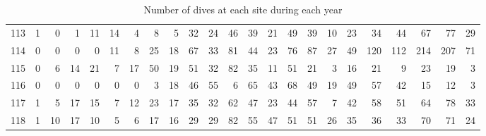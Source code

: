 \documentclass[a4paper]{article}
\begin{document}
\begin{sidewaystable}[h!]
\begin{tabular}{rrrrrrrrrrrrrrrrrrrrrrr}
  113 &   1 &   0 &   1 &  11 &  14 &   4 &   8 &   5 &  32 &  24 &  46 &  39 &  21 &  49 &  39 &  10 &  23 &  34 &  44 &  67 &  77 &  29 \\ 
  114 &   0 &   0 &   0 &   0 &  11 &   8 &  25 &  18 &  67 &  33 &  81 &  44 &  23 &  76 &  87 &  27 &  49 & 120 & 112 & 214 & 207 &  71 \\ 
  115 &   0 &   6 &  14 &  21 &   7 &  17 &  50 &  19 &  51 &  32 &  82 &  35 &  11 &  51 &  21 &   3 &  16 &  21 &   9 &  23 &  19 &   3 \\ 
  116 &   0 &   0 &   0 &   0 &   0 &   0 &   3 &  18 &  46 &  55 &   6 &  65 &  43 &  68 &  49 &  19 &  49 &  57 &  42 &  15 &  12 &   3 \\ 
  117 &   1 &   5 &  17 &  15 &   7 &  12 &  23 &  17 &  35 &  32 &  62 &  47 &  23 &  44 &  57 &   7 &  42 &  58 &  51 &  64 &  78 &  33 \\ 
  118 &   1 &  10 &  17 &  10 &   5 &   6 &  17 &  16 &  29 &  29 &  82 &  55 &  47 &  51 &  51 &  26 &  35 &  36 &  33 &  70 &  71 &  24 \\ 
   \hline
\end{tabular}
\caption{Number of dives at each site during each year} 
\label{table1}
\end{sidewaystable}

\end{document}
